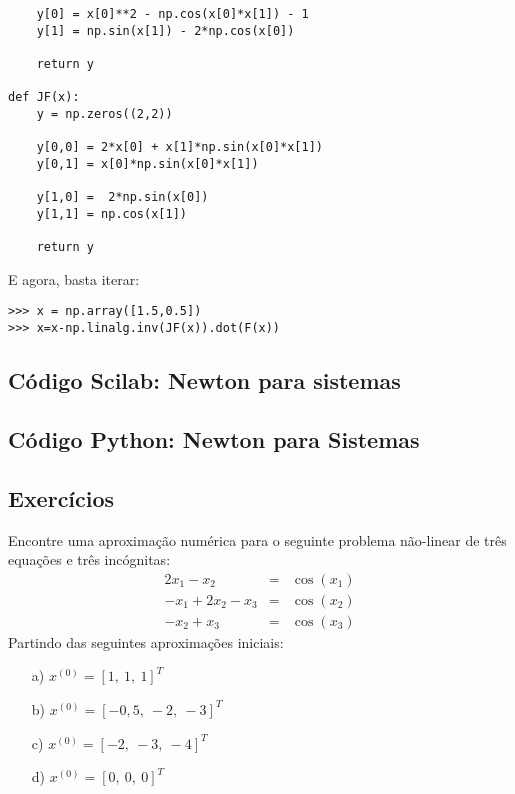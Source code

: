 \begin{sol}
\begin{verbatim}
    y[0] = x[0]**2 - np.cos(x[0]*x[1]) - 1
    y[1] = np.sin(x[1]) - 2*np.cos(x[0])
    
    return y

def JF(x):
    y = np.zeros((2,2))
    
    y[0,0] = 2*x[0] + x[1]*np.sin(x[0]*x[1])
    y[0,1] = x[0]*np.sin(x[0]*x[1])

    y[1,0] =  2*np.sin(x[0])
    y[1,1] = np.cos(x[1])

    return y
\end{verbatim}

E agora, basta iterar:
\begin{verbatim}
>>> x = np.array([1.5,0.5])
>>> x=x-np.linalg.inv(JF(x)).dot(F(x))
\end{verbatim}  
\fi
\end{sol}

\ifisscilab
\subsection{Código Scilab: Newton para sistemas}


\fi
\ifispython
\subsection{Código Python: Newton para Sistemas}


\fi

\subsection*{Exercícios}

\begin{Exercise} Encontre uma aproximação numérica para o seguinte problema não-linear de três equações e três incógnitas:
\begin{eqnarray*}
2x_1-x_2&=&\cos(x_1)\\
-x_1+2x_2-x_3&=&\cos(x_2)\\
-x_2+	x_3&=&\cos(x_3)
\end{eqnarray*}
Partindo das seguintes aproximações iniciais:
\begin{itemize}
\item[a)] $x^{(0)}=[1,~1,~1]^T$
\item[b)] $x^{(0)}=[-0,5,~-2,~-3]^T$
\item[c)] $x^{(0)}=[-2,~-3,~-4]^T$
\item[d)] $x^{(0)}=[0,~0,~0]^T$
\end{itemize}
\end{Exercise}


